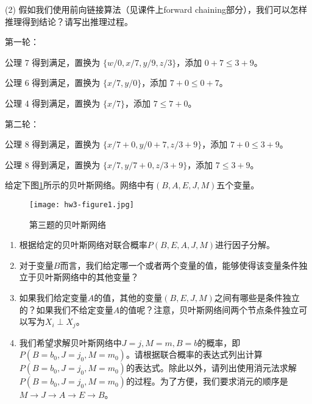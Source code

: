 \begin{problem}
\indent (2) 假如我们使用前向链接算法（见课件上forward chaining部分），我们可以怎样推理得到结论？请写出推理过程。

\begin{solution}
    第一轮：

    公理 7 得到满足，置换为 $\{w/0,x/7,y/9,z/3\}$，添加 $0+7\leq 3+9$。

    公理 6 得到满足，置换为 $\{x/7,y/0\}$，添加 $7+0\leq 0+7$。

    公理 4 得到满足，置换为 $\{x/7\}$，添加 $7\leq 7+0$。

    第二轮：

    公理 8 得到满足，置换为 $\{x/7+0,y/0+7,z/3+9\}$，添加 $7+0\leq 3+9$。

    公理 8 得到满足，置换为 $\{x/7,y/7+0,z/3+9\}$，添加 $7\leq 3+9$。

\end{solution}

\end{problem}

\begin{problem}
\indent 给定下图\ref{hw3-figure1}所示的贝叶斯网络。网络中有$(B, A, E, J, M)$五个变量。\\
\begin{figure}[htbp!]
  \centering
  \texttt{[image: hw3-figure1.jpg]}
  \caption{第三题的贝叶斯网络}
  \label{hw3-figure1}
\end{figure}

\begin{enumerate}
\item 根据给定的贝叶斯网络对联合概率$P(B,E,A,J,M)$进行因子分解。

\item 对于变量$B$而言，我们给定哪一个或者两个变量的值，能够使得该变量条件独立于贝叶斯网络中的其他变量？

\item 如果我们给定变量$A$的值，其他的变量$(B,E,J,M)$之间有哪些是条件独立的？如果我们不给定变量$A$的值呢？注意，贝叶斯网络间两个节点条件独立可以写为$X_i \perp  X_j$。

\item 我们希望求解贝叶斯网络中$J=j, M=m, B=b$的概率，即$P(B=b_0, J=j_0, M=m_0)$。请根据联合概率的表达式列出计算$P(B=b_0, J=j_0, M=m_0)$的表达式。除此以外，请列出使用消元法求解$P(B=b_0, J=j_0, M=m_0)$的过程。为了方便，我们要求消元的顺序是$M\rightarrow J\rightarrow A\rightarrow E\rightarrow B$。
\end{enumerate}
\end{problem}

